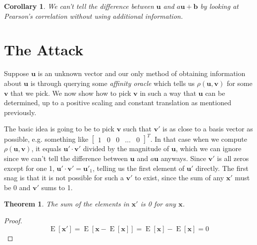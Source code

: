 \documentclass[11pt, oneside]{article}
\DeclareMathOperator{\E}{E}
\renewcommand{\vec}[1]{\bm{#1}}
\theoremstyle{plain}
\newtheorem{theorem}{Theorem}[section]
\newtheorem{corollary}{Corollary}[theorem]
\theoremstyle{definition}
\begin{document}
\begin{corollary}
  We can't tell the difference between \( \vec{u} \) and \( a \vec{u} + \vec{b}
  \) by looking at Pearson's correlation without using additional information.
\end{corollary}

\section{The Attack}
\label{sec:attack}
Suppose \( \vec{u} \) is an unknown vector and our only method of obtaining
information about \( \vec{u} \) is through querying some \textit{affinity
oracle} which tells us \( \rho (\vec{u}, \vec{v}) \) for some \( \vec{v}
\) that we pick. We now show how to pick \( \vec{v} \) in such a way that
\( \vec{u} \) can be determined, up to a positive scaling and constant
translation as mentioned previously.

The basic idea is going to be to pick \( \vec{v} \) such that \( \vec{v}' \) is
as close to a basis vector as possible, e.g. something like \( \begin{bmatrix}
1 & 0 & 0 & \dots & 0 \end{bmatrix}^T \). In that case when we compute \(
\rho(\vec{u}, \vec{v}) \), it equals \( \vec{u}' \cdot \vec{v}' \) divided by
the magnitude of \( \vec{u} \), which we can ignore since we can't tell the
difference between \( \vec{u} \) and \( a \vec{u} \) anyways. Since \( \vec{v}'
\) is all zeros except for one 1, \( \vec{u}' \cdot \vec{v}' = \vec{u}'_1 \),
telling us the first element of \( \vec{u}' \) directly. The first snag is that
it is not possible for such a \( \vec{v}' \) to exist, since the sum of any \(
\vec{x}' \) must be 0 and \( \vec{v}' \) sums to 1.

\begin{theorem}
  \label{thm:mean}
  The sum of the elements in \( \vec{x}' \) is 0 for any \( \vec{x} \).
\end{theorem}
\begin{proof}
  \[ \E[\vec{x}'] = \E[\vec{x} - \E[\vec{x}]] = \E[\vec{x}] - \E[\vec{x}] = 0 \]
\end{proof}
\end{document}
